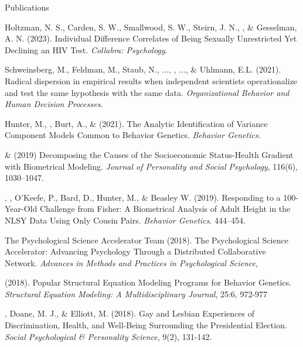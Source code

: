 \begin{rSection}{\textrm{Publications}}
\begin{etaremune}
\item Holtzman, N. S., Carden, S. W., Smallwood, S. W., Steirn, J. N., \meb, \& Gesselman, A. N. (2023). Individual Difference Correlates of Being Sexually Unrestricted Yet Declining an HIV Test. \textit{Collabra: Psychology}. 
%
\item Schweinsberg, M., Feldman, M., Staub, N., ..., \meb, ..., \& Uhlmann, E.L. (2021). Radical dispersion in empirical results when independent scientists operationalize and test the same hypothesis with the same data. \textit{Organizational Behavior and Human Decision Processes}. 
%
\item Hunter, M., \meb, Burt, A., \& \joe (2021). The Analytic Identification of Variance Component Models Common to Behavior Genetics. \textit{Behavior Genetics}. 
%
\item \meb \& \joe (2019) Decomposing the Causes of the Socioeconomic Status-Health Gradient with Biometrical Modeling. \textit{Journal of Personality and Social Psychology}, 116(6), 1030–1047.  %
%
\item\Joe, \meb, O'Keefe, P., Bard, D., Hunter, M., \& Beasley W. (2019). Responding to a 100-Year-Old Challenge from Fisher: A Biometrical Analysis of Adult Height in the NLSY Data Using Only Cousin Pairs. \textit{Behavior Genetics}. 444–454. 
%
\item The Psychological Science Accelerator Team (2018). The Psychological Science Accelerator: Advancing Psychology Through a Distributed Collaborative Network. \textit{Advances in Methods and Practices in Psychological Science}, 
%
\item \meb (2018). Popular Structural Equation Modeling Programs for Behavior Genetics. \textit{Structural Equation Modeling: A Multidisciplinary Journal}, 25:6, 972-977 
%
\item\meb, Doane, M. J., \& Elliott, M. (2018). Gay and Lesbian Experiences of Discrimination, Health, and Well-Being Surrounding the Presidential Election. \textit{Social Psychological \& Personality Science}, 9(2), 131-142. 

\end{etaremune}
\end{rSection}
